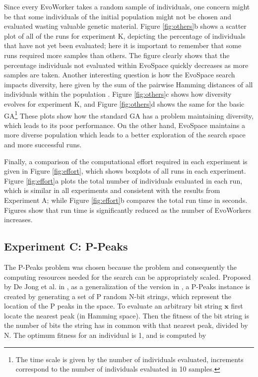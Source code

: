 Since every EvoWorker takes a random sample of individuals, one concern might be that some individuals of the initial population might
not be chosen and evaluated wasting valuable genetic material.
Figure \ref{fig:others}b shows a scatter plot of all of the runs for experiment K, depicting the percentage of individuals
that have not yet been evaluated; here it is important to remember that some runs required more samples than others.
The figure clearly shows that the percentage individuals not evaluated within EvoSpace quickly decreases as more samples are taken.
Another interesting question is how the EvoSpace search impacts diversity, here given by the sum of the pairwise Hamming distances
of all individuals within the population \cite{diversity}.
Figure \ref{fig:others}c shows how diversity evolves for experiment K, and
Figure \ref{fig:others}d shows the same for the basic GA\footnote{The time scale is given by
the number of individuals evaluated, increments correspond to the number of individuals evaluated in 10 samples.}
These plots show how the standard GA has a problem maintaining diversity, which leads to its poor performance.
On the other hand, EvoSpace maintains a more diverse population which leads to a better exploration of the search space and more successful runs.

Finally, a comparison of the computational effort required in each experiment is given in
Figure \ref{fig:effort}, which shows boxplots of all runs in each experiment.
Figure \ref{fig:effort}a plots the total number of individuals evaluated in each run, which is similar in all experiments
and consistent with the results from Experiment A;
while Figure \ref{fig:effort}b compares the total run time in seconds.
Figures show that run time is significantly reduced as the number of EvoWorkers increases.



\subsection{Experiment C: P-Peaks}

The P-Peaks problem was chosen because the problem and consequently the computing resources needed for the search can be appropriately scaled.
Proposed by De Jong et al. in \cite{Jong:PS97}, as a generalization of the version in \cite{Jong:1990}, a
P-Peaks instance is created by generating a set of P random N-bit
strings, which represent the location of the P peaks in the space. To
evaluate an arbitrary bit string \begin{math} \mathbf{x} \end{math}
first locate the nearest peak (in Hamming space). Then the fitness of
the bit string is the number of bits the string has in common with
that nearest peak, divided by N. The optimum fitness for an individual
is 1, and is computed by

